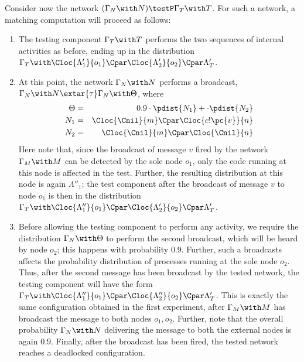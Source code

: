 \documentclass{LMCS}
\begin{document}
\begin{exa}
	\noindent Consider now the network $(\Gamma_N \with N) \testP \Gamma_T \with T$. 
  	For such a network, a matching computation will proceed as follows:
  	\begin{enumerate}
  	\item The testing component $\Gamma_T \with T$ performs the two sequences of internal activities as before, ending 
  	up in the distribution $\Gamma_T \with \Cloc{\Lambda'_1}{o_1} \Cpar \Cloc{\Lambda'_2}{o_2} \Cpar \Lambda'_T$.
  	\item At this point, the network $\Gamma_N \with N$ performs a broadcast, $\Gamma_N \with N 
  	\extar{\tau} \Gamma_N \with \Theta$, where 
		\begin{eqnarray*} 
		\Theta &=& 0.9 \cdot \pdist{N_1} + \cdot \pdist{N_2}\\
		N_1 &=& \Cloc{\Cnil}{m} \Cpar \Cloc{c!\pc{v}}{n}\\
		N_2 &=& \Cloc{\Cnil}{m} \Cpar \Cloc{\Cnil}{n}
  	\end{eqnarray*}
  	Here note that, since the broadcast of message $v$ fired by the network $\Gamma_M \with M$ 
  	can be detected by the sole node $o_1$, only the code running at this node is affected 
  	in the test. Further, the resulting distribution at this node is again $\Lambda''_{1}$; 
  	the test component after the broadcast of message $v$ to node $o_1$ is then in the 
  	distribution 
  	$\Gamma_T \with \Cloc{\Lambda''_1}{o_1}  \Cpar \Cloc{\Lambda'_2}{o_2} \Cpar \Lambda'_T$.
    \item Before allowing the testing component to perform any
        activity, we require the distribution $\Gamma_N \with \Theta$ 
        to perform the second
        broadcast, which will be heard by node $o_2$; this 
        happens with probability $0.9$. Further, such a broadcasts 
        affects the probability distribution of processes running at the sole node
        $o_2$. Thus, after the second message has been broadcast by
        the tested network, the testing component will have the form
        $\Gamma_T \with \Cloc{\Lambda''_1}{o_1} \Cpar \Cloc{\Lambda''_2}{o_2}
        \Cpar \Lambda'_T$. This is exactly the same configuration
        obtained in the first experiment, after $\Gamma_M \with
        M$ has broadcast the message to both nodes $o_1, o_2$.  Further,
        note that the overall probability  $\Gamma_N \with N$  delivering the 
        message to both the external nodes is again $0.9$. 
        Finally, after the broadcast has been fired, the tested network reaches 
        a deadlocked configuration.
  \end{enumerate}
  

\end{exa}
\end{document}

